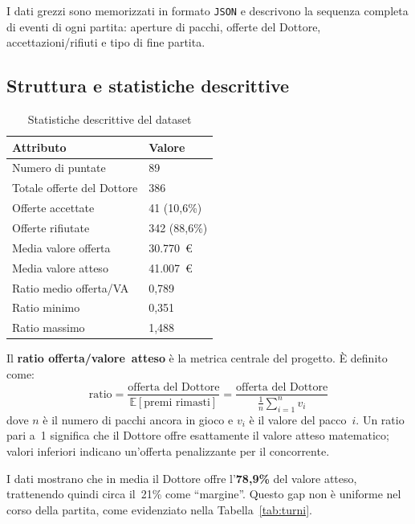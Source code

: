 \documentclass[12pt, a4paper]{article}
\begin{document}
I dati grezzi sono memorizzati in formato \texttt{JSON} e descrivono la sequenza
completa di eventi di ogni partita: aperture di pacchi, offerte del Dottore,
accettazioni/rifiuti e tipo di fine partita.

\subsection{Struttura e statistiche descrittive}

\begin{table}[H]
\centering
\caption{Statistiche descrittive del dataset}
\begin{tabularx}{\textwidth}{lX}
  \toprule
  \textbf{Attributo} & \textbf{Valore} \\
  \midrule
  Numero di puntate         & 89 \\
  Totale offerte del Dottore & 386 \\
  Offerte accettate          & 41 (10,6\%) \\
  Offerte rifiutate          & 342 (88,6\%) \\
  Media valore offerta        & 30.770~€ \\
  Media valore atteso         & 41.007~€ \\
  Ratio medio offerta/VA      & 0,789 \\
  Ratio minimo                & 0,351 \\
  Ratio massimo               & 1,488 \\
  \bottomrule
\end{tabularx}
\label{tab:statistiche}
\end{table}

Il \textbf{ratio offerta/valore~atteso} è la metrica centrale del progetto.
È definito come:
\begin{equation}
  \text{ratio} = \frac{\text{offerta del Dottore}}{\mathbb{E}[\text{premi rimasti}]}
  = \frac{\text{offerta del Dottore}}{\frac{1}{n}\sum_{i=1}^{n} v_i}
  \label{eq:ratio}
\end{equation}
dove $n$ è il numero di pacchi ancora in gioco e $v_i$ è il valore del
pacco~$i$. Un ratio pari a~1 significa che il Dottore offre esattamente il
valore atteso matematico; valori inferiori indicano un'offerta penalizzante per
il concorrente.

I dati mostrano che in media il Dottore offre l'\textbf{78,9\%} del valore
atteso, trattenendo quindi circa il~21\% come ``margine''. Questo gap non è
uniforme nel corso della partita, come evidenziato nella Tabella~\ref{tab:turni}.
\end{document}
